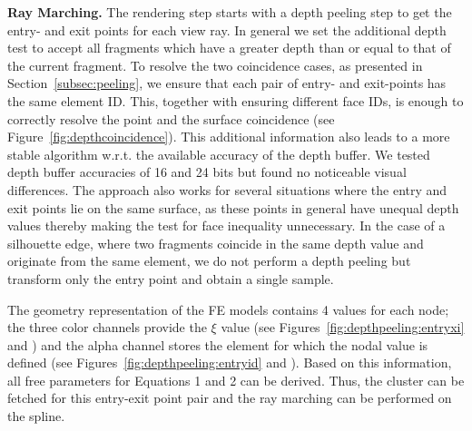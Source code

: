 \documentclass[journal]{vgtc}                %
\begin{document}
\noindent \textbf{Ray Marching.} The rendering step starts with a depth peeling step to get the entry- and exit points for each view ray. In general we set the additional depth test to accept all fragments which have a greater depth than or equal to that of the current fragment. To resolve the two coincidence cases, as presented in Section~\ref{subsec:peeling}, we ensure that each pair of entry- and exit-points has the same element ID. This, together with ensuring different face IDs, is enough to correctly resolve the point and the surface coincidence (see Figure~\ref{fig:depthcoincidence}). This additional information also leads to a more stable algorithm w.r.t. the available accuracy of the depth buffer. We tested depth buffer accuracies of 16 and 24 bits but found no noticeable visual differences. The approach also works for several situations where the entry and exit points lie on the same surface, as these points in general have unequal depth values thereby making the test for face inequality unnecessary. In the case of a silhouette edge, where two fragments coincide in the same depth value and originate from the same element, we do not perform a depth peeling but transform only the entry point and obtain a single sample.

The geometry representation of the FE models contains 4 values for each node; the three color channels provide the $\xi$ value (see Figures~\ref{fig:depthpeeling:entryxi} and ) and the alpha channel stores the element for which the nodal value is defined (see Figures~\ref{fig:depthpeeling:entryid} and ). Based on this information, all free parameters for Equations 1 and 2 can be derived. Thus, the cluster can be fetched for this entry-exit point pair and the ray marching can be performed on the spline.
\end{document}

